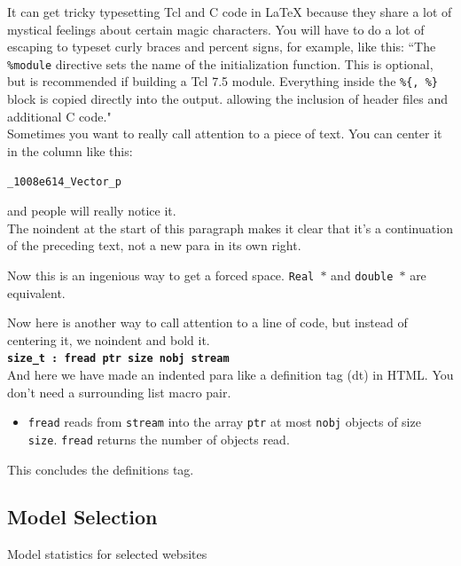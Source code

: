It can get tricky typesetting Tcl and C code in LaTeX because they share
a lot of mystical feelings about certain magic characters.  You
will have to do a lot of escaping to typeset curly braces and percent
signs, for example, like this:
``The {\tt \%module} directive
sets the name of the initialization function.  This is optional, but is
recommended if building a Tcl 7.5 module.
Everything inside the {\tt \%\{, \%\}}
block is copied directly into the output. allowing the inclusion of
header files and additional C code." \\

Sometimes you want to really call attention to a piece of text.  You
can center it in the column like this:
\begin{center}
  {\tt \_1008e614\_Vector\_p}
\end{center}
and people will really notice it.\\

\noindent
The noindent at the start of this paragraph makes it clear that it's
a continuation of the preceding text, not a new para in its own right.


Now this is an ingenious way to get a forced space.
{\tt Real~$*$} and {\tt double~$*$} are equivalent. 

Now here is another way to call attention to a line of code, but instead
of centering it, we noindent and bold it.\\

\noindent
{\bf \tt size\_t : fread ptr size nobj stream } \\

And here we have made an indented para like a definition tag (dt)
in HTML.  You don't need a surrounding list macro pair.
\begin{itemize}
  \item[]  {\tt fread} reads from {\tt stream} into the array {\tt ptr} at
    most {\tt nobj} objects of size {\tt size}.   {\tt fread} returns
    the number of objects read. 
\end{itemize}
This concludes the definitions tag.

\subsection{Model Selection}


\begin{table}[!th]                                                     
  \centering                                                            
  \scriptsize                                                           
                                       
  \caption{Model statistics for selected websites}
  \label{tbl:para-select}                                         
\end{table}                                                            


